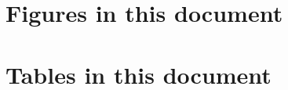 \pagebreak
\section{Figures in this document}
\par \vspace{0.5cm}

\listoffigures
\listoftables
\section{Tables in this document}
\par \vspace{0.5cm}